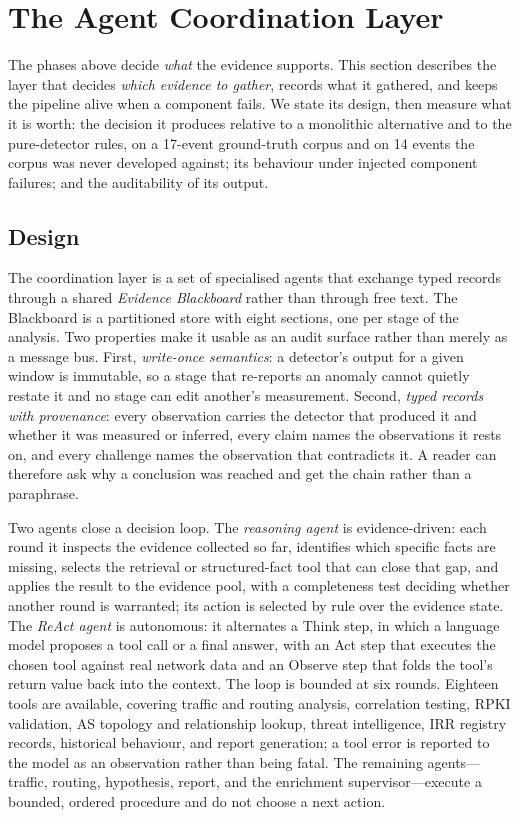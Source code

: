 \section{The Agent Coordination Layer}
\label{sec:agent}

The phases above decide \emph{what} the evidence supports. This section
describes the layer that decides \emph{which evidence to gather}, records
what it gathered, and keeps the pipeline alive when a component fails. We
state its design, then measure what it is worth: the decision it produces
relative to a monolithic alternative and to the pure-detector rules, on a
17-event ground-truth corpus and on 14 events the corpus was never
developed against; its behaviour under injected component failures; and the
auditability of its output.

\subsection{Design}

The coordination layer is a set of specialised agents that exchange typed
records through a shared \emph{Evidence Blackboard} rather than through
free text. The Blackboard is a partitioned store with eight sections, one
per stage of the analysis. Two properties make it usable as an audit
surface rather than merely as a message bus. First, \emph{write-once
semantics}: a detector's output for a given window is immutable, so a stage
that re-reports an anomaly cannot quietly restate it and no stage can edit
another's measurement. Second, \emph{typed records with provenance}: every
observation carries the detector that produced it and whether it was
measured or inferred, every claim names the observations it rests on, and
every challenge names the observation that contradicts it. A reader can
therefore ask why a conclusion was reached and get the chain rather than a
paraphrase.

Two agents close a decision loop. The \emph{reasoning agent} is
evidence-driven: each round it inspects the evidence collected so far,
identifies which specific facts are missing, selects the retrieval or
structured-fact tool that can close that gap, and applies the result to the
evidence pool, with a completeness test deciding whether another round is
warranted; its action is selected by rule over the evidence state. The
\emph{ReAct agent} is autonomous: it alternates a Think step, in which a
language model proposes a tool call or a final answer, with an Act step
that executes the chosen tool against real network data and an Observe
step that folds the tool's return value back into the context. The loop is
bounded at six rounds. Eighteen tools are available, covering traffic and
routing analysis, correlation testing, RPKI validation, AS topology and
relationship lookup, threat intelligence, IRR registry records, historical
behaviour, and report generation; a tool error is reported to the model as
an observation rather than being fatal. The remaining agents---traffic,
routing, hypothesis, report, and the enrichment supervisor---execute a
bounded, ordered procedure and do not choose a next action.

